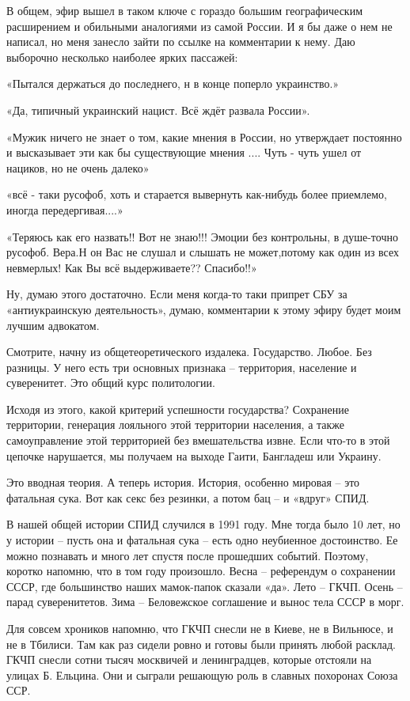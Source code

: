 В общем, эфир вышел в таком ключе с гораздо большим географическим расширением
и обильными аналогиями из самой России. И я бы даже о нем не написал, но меня
занесло зайти по ссылке на комментарии к нему. Даю выборочно несколько наиболее
ярких пассажей:

«Пытался держаться до последнего, н в конце поперло украинство.»

«Да, типичный украинский нацист. Всё ждёт развала России».

«Мужик ничего не знает о том, какие мнения в России, но утверждает постоянно и
высказывает эти как бы существующие мнения ....  Чуть - чуть ушел от нациков,
но не очень далеко»

«всё - таки русофоб, хоть и старается вывернуть как-нибудь более приемлемо,
иногда передергивая....»

«Теряюсь как его назвать!! Вот не знаю!!! Эмоции без контрольны, в душе-точно
русофоб. Вера.Н он Вас не слушал и слышать не может,потому как один из всех
невмерлых! Как Вы всё выдерживаете?? Спасибо!!»

Ну, думаю этого достаточно. Если меня когда-то таки припрет СБУ за
«антиукраинскую деятельность», думаю, комментарии к этому эфиру будет моим
лучшим адвокатом.

Смотрите, начну из общетеоретического издалека. Государство. Любое. Без
разницы. У него есть три основных признака – территория, население и
суверенитет. Это общий курс политологии.

Исходя из этого, какой критерий успешности государства? Сохранение территории,
генерация лояльного этой территории населения, а также самоуправление этой
территорией без вмешательства извне. Если что-то в этой цепочке нарушается, мы
получаем на выходе Гаити, Бангладеш или Украину.

Это вводная теория. А теперь история. История, особенно мировая – это фатальная
сука. Вот как секс без резинки, а потом бац – и «вдруг» СПИД.

В нашей общей истории СПИД случился в 1991 году. Мне тогда было 10 лет, но у
истории – пусть она и фатальная сука – есть одно неубиенное достоинство. Ее
можно познавать и много лет спустя после прошедших событий. Поэтому, коротко
напомню, что в том году произошло. Весна – референдум о сохранении СССР, где
большинство наших мамок-папок сказали «да». Лето – ГКЧП. Осень – парад
суверенитетов. Зима – Беловежское соглашение и вынос тела СССР в морг.

Для совсем хроников напомню, что ГКЧП снесли не в Киеве, не в Вильнюсе, и не в
Тбилиси. Там как раз сидели ровно и готовы были принять любой расклад. ГКЧП
снесли сотни тысяч москвичей и ленинградцев, которые отстояли на улицах Б.
Ельцина. Они и сыграли решающую роль в славных похоронах Союза ССР.


